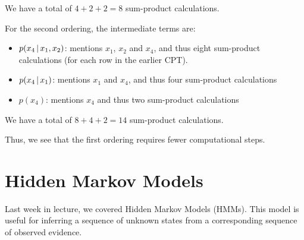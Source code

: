 \documentclass[12pt]{article}
\begin{document}
\begin{solution}
\begin{enumerate}
We have a total of $4+2+2=8$ sum-product calculations.

For the second ordering, the intermediate terms are:
%
\begin{itemize}
\item $p(x_4\,|\, x_1,x_2)$: mentions $x_1$, $x_2$ and $x_4$, and thus eight sum-product calculations (for each row
in the earlier CPT).
\item $p(x_4\,|\, x_1)$: mentions $x_1$ and $x_4$,  and thus four sum-product calculations
\item $p(x_4)$: mentions $x_4$ and thus two sum-product calculations
\end{itemize}

We have a total of $8+4+2=14$ sum-product calculations.
%
%

Thus, we see that the first ordering requires fewer computational steps.
\end{enumerate}
\end{solution}

\newpage

\section{Hidden Markov Models}

Last week in lecture, we covered Hidden Markov Models (HMMs). This model is useful for inferring a sequence of unknown states from a corresponding sequence of observed evidence.
\end{document}
